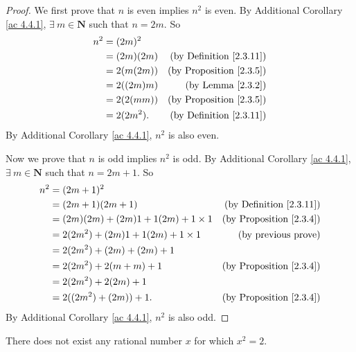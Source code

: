 \begin{proof}
We first prove that \(n\) is even implies \(n^2\) is even.
By Additional Corollary \ref{ac 4.4.1}, \(\exists\ m \in \mathbf{N}\) such that \(n = 2m\).
So
\begin{align*}
n^2 &= (2m)^2 \\
&= (2m)(2m) & \text{(by Definition \ref{2.3.11})} \\
&= 2(m(2m)) & \text{(by Proposition \ref{2.3.5})} \\
&= 2((2m)m) & \text{(by Lemma \ref{2.3.2})} \\
&= 2(2(mm)) & \text{(by Proposition \ref{2.3.5})} \\
&= 2(2m^2). & \text{(by Definition \ref{2.3.11})}
\end{align*}
By Additional Corollary \ref{ac 4.4.1}, \(n^2\) is also even.

Now we prove that \(n\) is odd implies \(n^2\) is odd.
By Additional Corollary \ref{ac 4.4.1}, \(\exists\ m \in \mathbf{N}\) such that \(n = 2m + 1\).
So
\begin{align*}
n^2 &= (2m + 1)^2 \\
&= (2m + 1)(2m + 1) & \text{(by Definition \ref{2.3.11})} \\
&= (2m)(2m) + (2m)1 + 1(2m) + 1 \times 1 & \text{(by Proposition \ref{2.3.4})} \\
&= 2(2m^2) + (2m)1 + 1(2m) + 1 \times 1 & \text{(by previous prove)} \\
&= 2(2m^2) + (2m) + (2m) + 1 \\
&= 2(2m^2) + 2(m + m) + 1 & \text{(by Proposition \ref{2.3.4})} \\
&= 2(2m^2) + 2(2m) + 1 \\
&= 2((2m^2) + (2m)) + 1. & \text{(by Proposition \ref{2.3.4})} \\
\end{align*}
By Additional Corollary \ref{ac 4.4.1}, \(n^2\) is also odd.
\end{proof}

\begin{proposition}\label{4.4.4}
There does not exist any rational number \(x\) for which \(x^2 = 2\).
\end{proposition}

